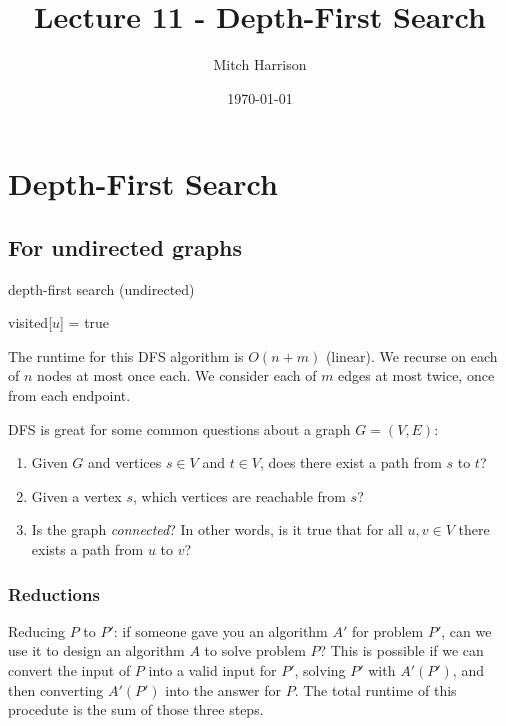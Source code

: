 \documentclass[titlepage, 12pt, leqno]{article}
\title{\Huge{Lecture 11 - Depth-First Search}}
\author{\large{Mitch Harrison}}
\date{\today}
\begin{document}
\setlength{\parskip}{1\baselineskip}
\setlength{\parindent}{15pt}
\maketitle
\tableofcontents
\newpage


\section{Depth-First Search}

\subsection{For undirected graphs}
\begin{algorithm}
\caption{depth-first search (undirected)}
\begin{algorithmic}[1]
\State visited[$u$] = true
        \State {}
    \EndIf
\EndFor
\EndProcedure 
\end{algorithmic}
\end{algorithm}

The runtime for this DFS algorithm is $O(n+m)$ (linear). We recurse on each of
$n$ nodes at most once each. We consider each of $m$ edges at most twice, once
from each endpoint.

DFS is great for some common questions about a graph $G = (V,E)$:
\begin{enumerate}
    \item Given $G$ and vertices $s \in V$ and $t \in V$, does there exist a
        path from $s$ to $t$?
    \item Given a vertex $s$, which vertices are reachable from $s$?
    \item Is the graph \textit{connected}? In other words, is it true that
        for all $u,v \in V$ there exists a path from $u$ to $v$?
\end{enumerate}

\subsubsection{Reductions}
Reducing $P$ to $P'$: if someone gave you an algorithm $A'$ for problem $P'$, 
can we use it to design an algorithm $A$ to solve problem $P$? This is possible
if we can convert the input of $P$ into a valid input for $P'$, solving $P'$
with $A'(P')$, and then converting $A'(P')$ into the answer for $P$. The total 
runtime of this procedute is the sum of those three steps.
\end{document}
